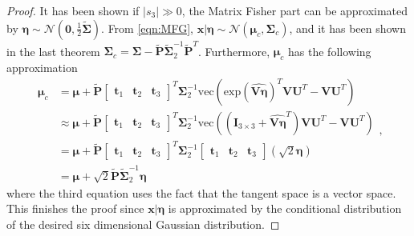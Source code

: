 \documentclass[12pt]{article}
\begin{document}
\begin{proof}
	It has been shown if $|s_3|\gg 0$, the Matrix Fisher part can be approximated by $\bm{\eta}\sim \mathcal{N}(\mathbf{0},\frac{1}{2}\tilde{\mathbf{\Sigma}})$.
	From \eqref{eqn:MFG}, $\bm{x}|\bm{\eta}\sim \mathcal{N}(\bm{\mu}_c,\mathbf{\Sigma}_c)$, and it has been shown in the last theorem $\mathbf{\Sigma}_c = \mathbf{\Sigma}-\tilde{\mathbf{P}}\tilde{\mathbf{\Sigma}}_2^{-1}\tilde{\mathbf{P}}^T$.
	Furthermore, $\bm{\mu}_c$ has the following approximation
	\begin{equation}
		\label{eqn:linearApprox}
		\begin{split}
			\bm{\mu}_c &= \bm{\mu} + \tilde{\mathbf{P}}\begin{bmatrix}
				\bm{t}_1 & \bm{t}_2 & \bm{t}_3
			\end{bmatrix}^T\mathbf{\Sigma}_2^{-1} \mathrm{vec}\left(\mathrm{exp}(\widehat{\mathbf{V}\bm{\eta}})^T\mathbf{V}\mathbf{U}^T-\mathbf{V}\mathbf{U}^T\right) \\
			&\approx \bm{\mu} + \tilde{\mathbf{P}}\begin{bmatrix}
				\bm{t}_1 & \bm{t}_2 & \bm{t}_3
			\end{bmatrix}^T\mathbf{\Sigma}_2^{-1} \mathrm{vec}\left((\mathbf{I}_{3\times 3}+\widehat{\mathbf{V}\bm{\eta}}^T)\mathbf{V}\mathbf{U}^T-\mathbf{V}\mathbf{U}^T\right)\\
			&= \bm{\mu} + \tilde{\mathbf{P}}\begin{bmatrix}
				\bm{t}_1 & \bm{t}_2 & \bm{t}_3
			\end{bmatrix}^T\mathbf{\Sigma}_2^{-1}\begin{bmatrix}
				\bm{t}_1 & \bm{t}_2 & \bm{t}_3
			\end{bmatrix}(\sqrt{2}\bm{\eta}) \\
			&= \bm{\mu} + \sqrt{2}\tilde{\mathbf{P}}\tilde{\mathbf{\Sigma}}_2^{-1}\bm{\eta}
		\end{split},
	\end{equation}
	where the third equation uses the fact that the tangent space is a vector space.
	This finishes the proof since $\bm{x}|\bm{\eta}$ is approximated by the conditional distribution of the desired six dimensional Gaussian distribution.
\end{proof}
\end{document}
